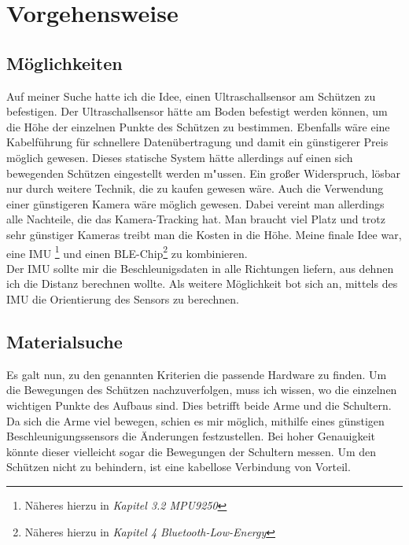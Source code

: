 \chapter{Vorgehensweise}
\section{Möglichkeiten}
Auf meiner Suche hatte ich die Idee, einen Ultraschallsensor am Schützen zu befestigen. Der 
Ultraschallsensor hätte am Boden befestigt werden können, um die Höhe der einzelnen 
Punkte des Schützen zu bestimmen. Ebenfalls wäre eine Kabelführung für schnellere 
Datenübertragung und damit ein günstigerer Preis möglich gewesen. Dieses statische System
hätte allerdings auf einen sich bewegenden Schützen eingestellt werden m"ussen. Ein großer Widerspruch,
lösbar nur durch weitere Technik, die zu kaufen gewesen wäre.
Auch die Verwendung einer günstigeren Kamera wäre möglich gewesen. Dabei vereint man 
allerdings alle Nachteile, die das Kamera-Tracking hat. Man braucht viel Platz und trotz sehr 
günstiger Kameras treibt man die Kosten in die Höhe.
Meine finale Idee war, eine IMU \footnote{Näheres hierzu in \textit{Kapitel 3.2 MPU9250}} und einen 
BLE-Chip\footnote{Näheres hierzu in \textit{Kapitel 4 Bluetooth-Low-Energy}} zu kombinieren. \\
Der IMU sollte mir die Beschleunigsdaten in alle Richtungen liefern, aus dehnen ich die Distanz berechnen wollte.
Als weitere Möglichkeit bot sich an, mittels des IMU die Orientierung des Sensors zu berechnen.


%

\section{Materialsuche}
Es galt nun, zu den genannten Kriterien die passende Hardware zu finden. Um die Bewegungen des 
Schützen nachzuverfolgen, muss ich wissen, wo die einzelnen wichtigen Punkte des Aufbaus 
sind. Dies betrifft beide Arme und die Schultern. Da sich die Arme viel bewegen, schien es mir 
möglich, mithilfe eines günstigen Beschleunigungssensors die Änderungen festzustellen. Bei 
hoher Genauigkeit könnte dieser vielleicht sogar die Bewegungen der Schultern messen.
Um den Schützen nicht zu behindern, ist eine kabellose Verbindung von Vorteil.

